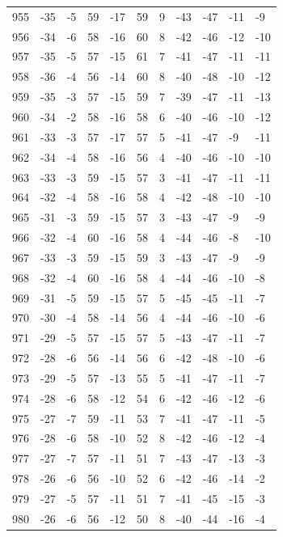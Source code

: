 \begin{table}[H]
\begin{tabular}{lllllllllll}
955 & -35 & -5 & 59 & -17 & 59 & 9 & -43 & -47 & -11 & -9 \\
956 & -34 & -6 & 58 & -16 & 60 & 8 & -42 & -46 & -12 & -10 \\
957 & -35 & -5 & 57 & -15 & 61 & 7 & -41 & -47 & -11 & -11 \\
958 & -36 & -4 & 56 & -14 & 60 & 8 & -40 & -48 & -10 & -12 \\
959 & -35 & -3 & 57 & -15 & 59 & 7 & -39 & -47 & -11 & -13 \\
960 & -34 & -2 & 58 & -16 & 58 & 6 & -40 & -46 & -10 & -12 \\
961 & -33 & -3 & 57 & -17 & 57 & 5 & -41 & -47 & -9 & -11 \\
962 & -34 & -4 & 58 & -16 & 56 & 4 & -40 & -46 & -10 & -10 \\
963 & -33 & -3 & 59 & -15 & 57 & 3 & -41 & -47 & -11 & -11 \\
964 & -32 & -4 & 58 & -16 & 58 & 4 & -42 & -48 & -10 & -10 \\
965 & -31 & -3 & 59 & -15 & 57 & 3 & -43 & -47 & -9 & -9 \\
966 & -32 & -4 & 60 & -16 & 58 & 4 & -44 & -46 & -8 & -10 \\
967 & -33 & -3 & 59 & -15 & 59 & 3 & -43 & -47 & -9 & -9 \\
968 & -32 & -4 & 60 & -16 & 58 & 4 & -44 & -46 & -10 & -8 \\
969 & -31 & -5 & 59 & -15 & 57 & 5 & -45 & -45 & -11 & -7 \\
970 & -30 & -4 & 58 & -14 & 56 & 4 & -44 & -46 & -10 & -6 \\
971 & -29 & -5 & 57 & -15 & 57 & 5 & -43 & -47 & -11 & -7 \\
972 & -28 & -6 & 56 & -14 & 56 & 6 & -42 & -48 & -10 & -6 \\
973 & -29 & -5 & 57 & -13 & 55 & 5 & -41 & -47 & -11 & -7 \\
974 & -28 & -6 & 58 & -12 & 54 & 6 & -42 & -46 & -12 & -6 \\
975 & -27 & -7 & 59 & -11 & 53 & 7 & -41 & -47 & -11 & -5 \\
976 & -28 & -6 & 58 & -10 & 52 & 8 & -42 & -46 & -12 & -4 \\
977 & -27 & -7 & 57 & -11 & 51 & 7 & -43 & -47 & -13 & -3 \\
978 & -26 & -6 & 56 & -10 & 52 & 6 & -42 & -46 & -14 & -2 \\
979 & -27 & -5 & 57 & -11 & 51 & 7 & -41 & -45 & -15 & -3 \\
980 & -26 & -6 & 56 & -12 & 50 & 8 & -40 & -44 & -16 & -4 \\

\end{tabular}
\end{table}
